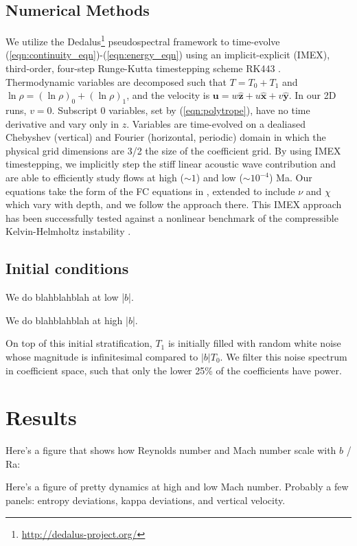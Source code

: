\documentclass[twocolumn, amsmath, amsfonts, amssymb]{aastex62}
\begin{document}
\subsection{Numerical Methods}
We utilize the 
Dedalus\footnote{\url{http://dedalus-project.org/}} 
pseudospectral framework \cite{burns&all2016} to time-evolve  
(\ref{eqn:continuity_eqn})-(\ref{eqn:energy_eqn}) 
using an implicit-explicit (IMEX), third-order, four-step 
Runge-Kutta timestepping scheme RK443 \cite{ascher&all1997}.  
Thermodynamic variables are decomposed such that $T = T_0 + T_1$ and
$\ln\rho = (\ln\rho)_0 + (\ln\rho)_1$, 
and the velocity is $\bm{u} = w\bm{\hat{z}} + u\bm{\hat{x}} + v\bm{\hat{y}}$.
In our 2D runs, $v = 0$.
Subscript 0 variables, set by (\ref{eqn:polytrope}), 
have no time derivative and vary only in $z$.
Variables are time-evolved on a dealiased Chebyshev (vertical)
and Fourier (horizontal, periodic) domain in which the
physical grid dimensions are 3/2 the size of the coefficient grid.  
By using IMEX timestepping, we implicitly step the 
stiff linear acoustic wave contribution and are able to
efficiently study flows at high ($\sim 1$) 
and low ($\sim 10^{-4}$) Ma.  Our equations take the form
of the FC equations in \cite{lecoanet&all2014}, extended to include
$\nu$ and $\chi$ which vary with depth, and we follow the approach there.
This IMEX approach has been successfully 
tested against a nonlinear benchmark  of the compressible 
Kelvin-Helmholtz instability \cite{Lecoanet_et_al_2016_KH}.


\subsection{Initial conditions}
We do blahblahblah at low |$b$|.

We do blahblahblah at high |$b$|.

On top of this initial stratification, $T_1$ is initially filled with
random white noise whose magnitude is infinitesimal
compared to $|b| T_0$.
We filter this noise spectrum in coefficient space, 
such that only the lower 25\% of the coefficients
have power. 




\section{Results} \label{sec:results}
Here's a figure that shows how Reynolds number and Mach number
scale with $b$ / Ra:

Here's a figure of pretty dynamics at high and low Mach number. Probably
a few panels: entropy deviations, kappa deviations, and vertical velocity.
\end{document}
